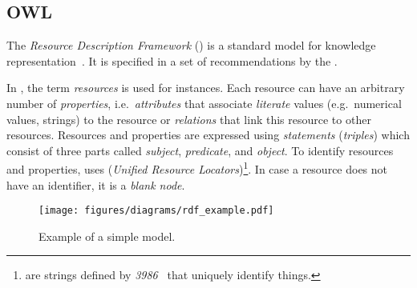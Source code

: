 \subsection{OWL}
\label{subsec:owl}

The \emph{Resource Description Framework} () is a standard model for knowledge representation~\cite{RDF}. It is specified in a set of recommendations by the .

In , the term \emph{resources} is used for instances. Each resource can have an arbitrary number of \emph{properties}, i.e.\ \emph{attributes} that associate \emph{literate} values (e.g.\ numerical values, strings) to the resource or \emph{relations} that link this resource to other resources. Resources and properties are expressed using \emph{statements} (\emph{triples}) which consist of three parts called \emph{subject}, \emph{predicate}, and \emph{object}. To identify resources and properties,  uses  (\emph{Unified Resource Locators})\footnote{ are strings defined by \emph{ 3986}~\cite{rfc3986} that uniquely identify things.}. In case a resource does not have an identifier, it is a \emph{blank node}.

\begin{figure}
\centering
\texttt{[image: figures/diagrams/rdf\_example.pdf]}
\caption[Example of a simple  model]{Example of a simple  model.}
\label{fig:rdf_example}
\end{figure}

